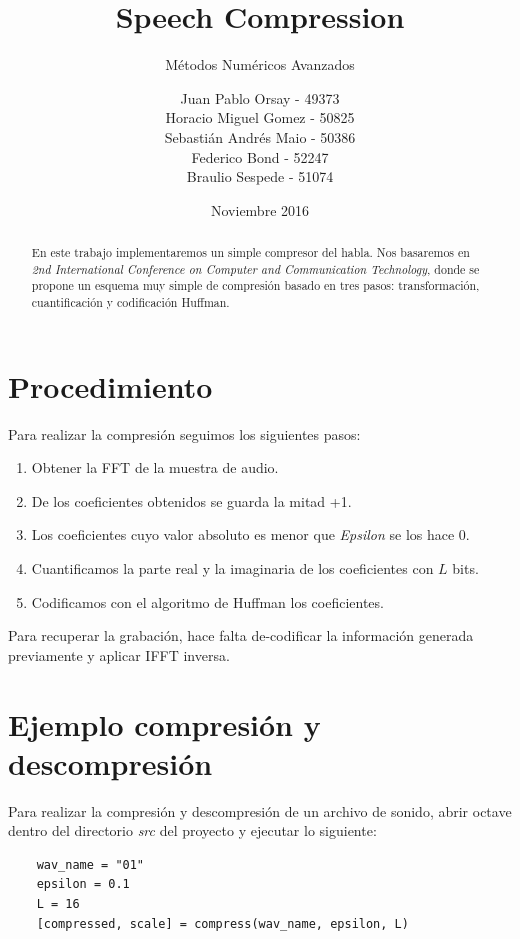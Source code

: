 \documentclass[spanish]{scrartcl}
\subtitle{Métodos Numéricos Avanzados}
\title{Speech Compression}
\author{
Juan Pablo Orsay - 49373 \\
Horacio Miguel Gomez - 50825 \\
Sebastián Andrés Maio - 50386 \\
Federico Bond - 52247 \\
Braulio Sespede - 51074
}
\date{Noviembre 2016}
\let\endtitlepage\relax
\begin{document}
\maketitle
\endtitlepage

\begin{abstract}
En este trabajo implementaremos un simple compresor del habla. Nos basaremos en \textit{2nd International Conference on Computer and Communication Technology}, donde se propone un esquema muy simple de compresión basado en tres pasos: transformación, cuantificación y codificación Huffman.
\end{abstract}
\break
\tableofcontents
\break
\section{Procedimiento}
Para realizar la compresión seguimos los siguientes pasos:
\begin{enumerate}
\item Obtener la FFT de la muestra de audio.
\item De los coeficientes obtenidos se guarda la mitad +1.
\item Los coeficientes cuyo valor absoluto es menor que \textit{Epsilon} se los hace 0.
\item Cuantificamos la parte real y la imaginaria de los coeficientes con $L$ bits.
\item Codificamos con el algoritmo de Huffman los coeficientes.
\end{enumerate}
Para recuperar la grabación, hace falta de-codificar la información generada previamente y aplicar IFFT inversa.
\section{Ejemplo compresión y descompresión}
Para realizar la compresión y descompresión de un archivo de sonido, abrir octave dentro del directorio \textit{src} del proyecto y ejecutar lo siguiente:
\begin{lstlisting}
    wav_name = "01"
    epsilon = 0.1
    L = 16
    [compressed, scale] = compress(wav_name, epsilon, L)
\end{lstlisting}
\end{document}
